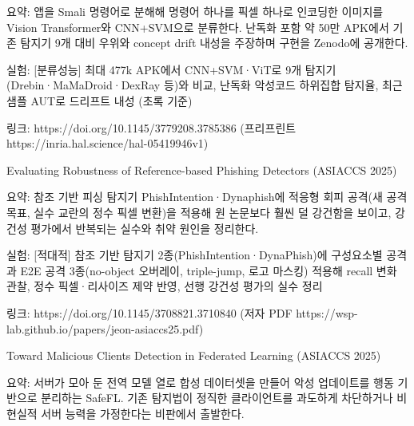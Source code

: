 \par\noindent \textbullet\enspace 요약: 앱을 Smali 명령어로 분해해 명령어 하나를 픽셀 하나로 인코딩한 이미지를 Vision Transformer와 CNN+\allowbreak{}SVM으로 분류한다. 난독화 포함 약 50만 APK에서 기존 탐지기 9개 대비 우위와 concept drift 내성을 주장하며 구현을 Zenodo에 공개한다.


\par\noindent \textbullet\enspace 실험: [분류성능] 최대 477k APK에서 CNN+\allowbreak{}SVM·ViT로 9개 탐지기(Drebin·MaMaDroid·DexRay 등)와 비교, 난독화 악성코드 하위집합 탐지율, 최근 샘플 AUT로 드리프트 내성 (초록 기준)


\par\noindent \textbullet\enspace 링크: https:/\allowbreak{}/\allowbreak{}doi.org/\allowbreak{}10.1145/\allowbreak{}3779208.3785386 (프리프린트 https:/\allowbreak{}/\allowbreak{}inria.hal.science/\allowbreak{}hal-05419946v1)



\par\noindent \textbullet\enspace Evaluating Robustness of Reference-based Phishing Detectors (ASIACCS 2025)

\par\noindent \textbullet\enspace 요약: 참조 기반 피싱 탐지기 PhishIntention·Dynaphish에 적응형 회피 공격(새 공격 목표, 실수 교란의 정수 픽셀 변환)을 적용해 원 논문보다 훨씬 덜 강건함을 보이고, 강건성 평가에서 반복되는 실수와 취약 원인을 정리한다.


\par\noindent \textbullet\enspace 실험: [적대적] 참조 기반 탐지기 2종(PhishIntention·DynaPhish)에 구성요소별 공격과 E2E 공격 3종(no-object 오버레이, triple-jump, 로고 마스킹) 적용해 recall 변화 관찰, 정수 픽셀·리사이즈 제약 반영, 선행 강건성 평가의 실수 정리


\par\noindent \textbullet\enspace 링크: https:/\allowbreak{}/\allowbreak{}doi.org/\allowbreak{}10.1145/\allowbreak{}3708821.3710840 (저자 PDF https:/\allowbreak{}/\allowbreak{}wsp-lab.github.io/\allowbreak{}papers/\allowbreak{}jeon-asiaccs25.pdf)



\par\noindent \textbullet\enspace Toward Malicious Clients Detection in Federated Learning (ASIACCS 2025)

\par\noindent \textbullet\enspace 요약: 서버가 모아 둔 전역 모델 열로 합성 데이터셋을 만들어 악성 업데이트를 행동 기반으로 분리하는 SafeFL. 기존 탐지법이 정직한 클라이언트를 과도하게 차단하거나 비현실적 서버 능력을 가정한다는 비판에서 출발한다.


